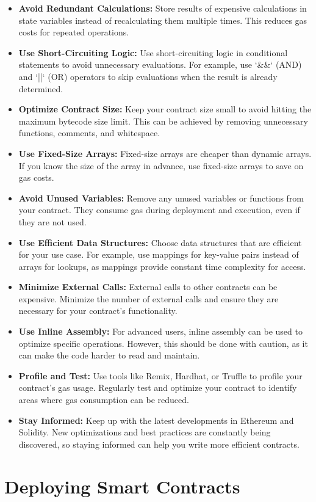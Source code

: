 \documentclass[12pt, a4paper]{article}
\begin{document}
\begin{itemize}
    \item \textbf{Avoid Redundant Calculations:} Store results of expensive calculations in state variables instead of recalculating them multiple times. This reduces gas costs for repeated operations.
    \item \textbf{Use Short-Circuiting Logic:} Use short-circuiting logic in conditional statements to avoid unnecessary evaluations. For example, use `\&\&` (AND) and `||` (OR) operators to skip evaluations when the result is already determined.
    \item \textbf{Optimize Contract Size:} Keep your contract size small to avoid hitting the maximum bytecode size limit. This can be achieved by removing unnecessary functions, comments, and whitespace.
    \item \textbf{Use Fixed-Size Arrays:} Fixed-size arrays are cheaper than dynamic arrays. If you know the size of the array in advance, use fixed-size arrays to save on gas costs.
    \item \textbf{Avoid Unused Variables:} Remove any unused variables or functions from your contract. They consume gas during deployment and execution, even if they are not used.
    \item \textbf{Use Efficient Data Structures:} Choose data structures that are efficient for your use case. For example, use mappings for key-value pairs instead of arrays for lookups, as mappings provide constant time complexity for access.
    \item \textbf{Minimize External Calls:} External calls to other contracts can be expensive. Minimize the number of external calls and ensure they are necessary for your contract's functionality.
    \item \textbf{Use Inline Assembly:} For advanced users, inline assembly can be used to optimize specific operations. However, this should be done with caution, as it can make the code harder to read and maintain.
    \item \textbf{Profile and Test:} Use tools like Remix, Hardhat, or Truffle to profile your contract's gas usage. Regularly test and optimize your contract to identify areas where gas consumption can be reduced.
    \item \textbf{Stay Informed:} Keep up with the latest developments in Ethereum and Solidity. New optimizations and best practices are constantly being discovered, so staying informed can help you write more efficient contracts.
\end{itemize}
\section{Deploying Smart Contracts}
\end{document}
